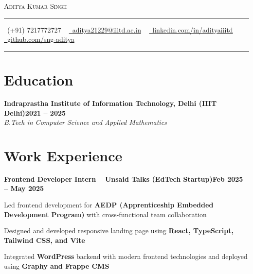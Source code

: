 \documentclass[letterpaper,10pt]{article}
\newcommand{\documentTitle}[2]{
  \begin{center}
    {\LARGE\scshape\color{accentTitle} #1}
    \vspace{5pt}
    {\color{accentLine} \hrule}
    \vspace{2pt}
    \footnotesize{#2}
    \vspace{2pt}
    {\color{accentLine} \hrule}
  \end{center}
}
\newcommand{\heading}[2]{
  \hspace{10pt}#1\hfill#2\\
}
\newcommand{\headingBf}[2]{
  \heading{\textbf{#1}}{\textbf{#2}}
}
\newcommand{\headingIt}[2]{
  \heading{\textit{#1}}{\textit{#2}}
}
\newenvironment{resume_list}{
  \vspace{-7pt}
  \begin{itemize}[itemsep=-2px, parsep=1pt, leftmargin=30pt]
}{
  \end{itemize}
}
\begin{document}

  \documentTitle{Aditya Kumar Singh}{
  \faPhone\ (+91) 7217772727 ~
  \href{mailto:aditya21229@iiitd.ac.in}{\faEnvelope\ aditya21229@iiitd.ac.in} ~
  \href{https://www.linkedin.com/in/adityaiiitd/}{\faLinkedin\ linkedin.com/in/adityaiiitd} ~
  \href{https://github.com/sng-aditya}{\faGithub\ github.com/sng-aditya}
}


  \section{Education}

    \headingBf{Indraprastha Institute of Information Technology, Delhi (IIIT Delhi)}{2021 -- 2025}
    \headingIt{B.Tech in Computer Science and Applied Mathematics}{}



  \section{Work Experience}

  \headingBf{Frontend Developer Intern -- Unsaid Talks (EdTech Startup)}{Feb 2025 -- May 2025}
  \begin{resume_list}
    \item Led frontend development for \textbf{AEDP (Apprenticeship Embedded Development Program)} with cross-functional team collaboration
    \item Designed and developed responsive landing page using \textbf{React, TypeScript, Tailwind CSS, and Vite}
    \item Integrated \textbf{WordPress} backend with modern frontend technologies and deployed using \textbf{Graphy and Frappe CMS}
  \end{resume_list}
\end{document}
